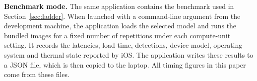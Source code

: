 \textbf{Benchmark mode.} The same application contains the benchmark used in
Section~\ref{sec:ladder}. When launched with a command-line argument from the
development machine, the application loads the selected model and runs the
bundled images for a fixed number of repetitions under each compute-unit
setting. It records the latencies, load time, detections, device model,
operating system and thermal state reported by iOS. The application writes
these results to a JSON file, which is then copied to the laptop. All timing
figures in this paper come from these files.

